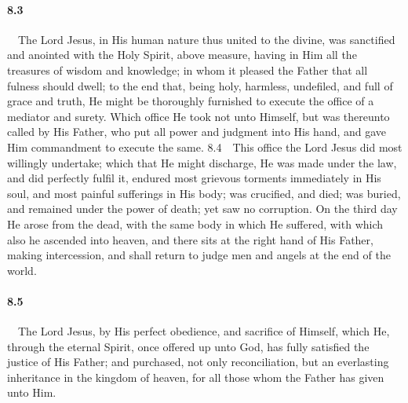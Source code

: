 \paragraph{8.3}\ \ The Lord Jesus, in His human nature thus united to the divine, was sanctified and anointed with the Holy Spirit, above measure, having in Him all the treasures of wisdom and knowledge; in whom it pleased the Father that all fulness should dwell; to the end that, being holy, harmless, undefiled, and full of grace and truth, He might be thoroughly furnished to execute the office of a mediator and surety. Which office He took not unto Himself, but was thereunto called by His Father, who put all power and judgment into His hand, and gave Him commandment to execute the same.  8.4\ \ This office the Lord Jesus did most willingly undertake; which that He might discharge, He was made under the law, and did perfectly fulfil it, endured most grievous torments immediately in His soul, and most painful sufferings in His body; was crucified, and died; was buried, and remained under the power of death; yet saw no corruption. On the third day He arose from the dead, with the same body in which He suffered, with which also he ascended into heaven, and there sits at the right hand of His Father, making intercession, and shall return to judge men and angels at the end of the world.   
\bigskip
\paragraph{8.5}\ \ The Lord Jesus, by His perfect obedience, and sacrifice of Himself, which He, through the eternal Spirit, once offered up unto God, has fully satisfied the justice of His Father; and purchased, not only reconciliation, but an everlasting inheritance in the kingdom of heaven, for all those whom the Father has given unto Him.   
\bigskip
